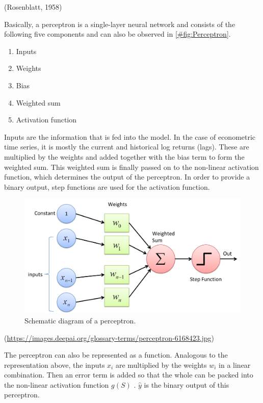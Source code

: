\documentclass[
]{article}
\begin{document}
(Rosenblatt, 1958)

Basically, a perceptron is a single-layer neural network and consists of
the following five components and can also be observed in
\ref{#fig:Perceptron}.

\begin{enumerate}
\def\labelenumi{\arabic{enumi}.}
\item
  Inputs
\item
  Weights
\item
  Bias
\item
  Weighted sum
\item
  Activation function
\end{enumerate}

Inputs are the information that is fed into the model. In the case of
econometric time series, it is mostly the current and historical log
returns (lags). These are multiplied by the weights and added together
with the bias term to form the weighted sum. This weighted sum is
finally passed on to the non-linear activation function, which
determines the output of the perceptron. In order to provide a binary
output, step functions are used for the activation function.

\begin{figure}
\hypertarget{fig:Perceptron}{%
\centering
\includegraphics{images/Perceptron.jpg}
\caption{Schematic diagram of a perceptron.}\label{fig:Perceptron}
}
\end{figure}

(\url{https://images.deepai.org/glossary-terms/perceptron-6168423.jpg})

The perceptron can also be represented as a function. Analogous to the
representation above, the inputs \(x_{i}\) are multiplied by the weights
\(w_{i}\) in a linear combination. Then an error term is added so that
the whole can be packed into the non-linear activation function \(g(S)\)
. \(\hat{y}\) is the binary output of this perceptron.
\end{document}
